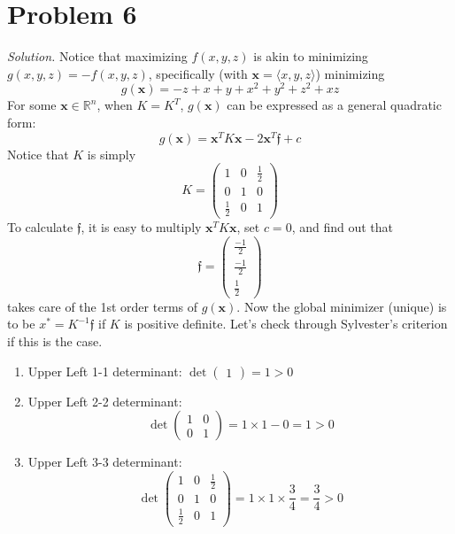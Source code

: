 \documentclass{article}
\begin{document}
\section*{Problem 6}
\emph{Solution. }Notice that maximizing $f(x,y,z)$ is akin to minimizing $g(x,y,z) = -f(x,y,z)$, specifically (with $\mathbf{x} = \langle x, y, z\rangle$) minimizing 
\begin{equation*}
    g(\mathbf{x}) = -z + x + y + x^2 + y^2 + z^2 + xz
\end{equation*}
For some $\mathbf{x} \in \mathbb{R}^{n}$, when $K = K^{T}$, $g(\mathbf{x})$ can be expressed as a general quadratic form:
\begin{equation*}
    g(\mathbf{x}) = \mathbf{x}^{T}K\mathbf{x} - 2\mathbf{x}^{T}\mathfrak{f} + c
\end{equation*}
Notice that $K$ is simply
\begin{equation*}
    K = \begin{pmatrix}
        1 & 0 & \frac{1}{2}\\
        0 & 1 & 0\\
        \frac{1}{2} & 0 & 1
    \end{pmatrix}
\end{equation*}
To calculate $\mathfrak{f}$, it is easy to multiply $\mathbf{x}^{T}K\mathbf{x}$, set $c = 0$, and find out that 
\begin{equation*}
    \mathfrak{f} = \begin{pmatrix}
        \frac{-1}{2}\\
        \frac{-1}{2}\\
        \frac{1}{2}
    \end{pmatrix}
\end{equation*}
takes care of the 1st order terms of $g(\mathbf{x})$. Now the global minimizer (unique) is to be $x^{*} = K^{-1}\mathfrak{f}$ if $K$ is positive definite. Let's check through Sylvester's criterion if this is the case. 
\begin{enumerate}
    \item Upper Left 1-1 determinant: $\det \begin{pmatrix}
            1
        \end{pmatrix} = 1 > 0$
    \item Upper Left 2-2 determinant:
    \begin{equation*}
        \det \begin{pmatrix}
            1 & 0\\
            0 & 1
        \end{pmatrix} = 1\times 1 - 0 = 1 > 0
    \end{equation*}
    \item  Upper Left 3-3 determinant:
    \begin{equation*}
        \det \begin{pmatrix}
        1 & 0 & \frac{1}{2}\\
        0 & 1 & 0\\
        \frac{1}{2} & 0 & 1
    \end{pmatrix} = 1 \times 1 \times \frac{3}{4} = \frac{3}{4} > 0
    \end{equation*}
\end{enumerate}
\end{document}
